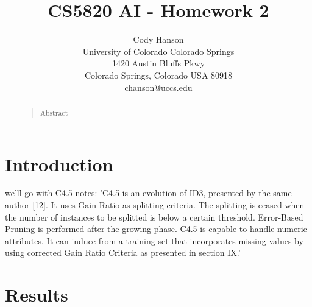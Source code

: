 \documentclass[letterpaper]{article}
\begin{document}
\title{CS5820 AI - Homework 2}
\author{Cody Hanson\\
University of Colorado Colorado Springs\\
1420 Austin Bluffs Pkwy\\
Colorado Springs, Colorado USA 80918\\
chanson@uccs.edu}
\maketitle
\begin{abstract}
\begin{quote}
Abstract
\end{quote}
\end{abstract}

\section{Introduction}


we'll go with C4.5
notes:
'C4.5 is an evolution of ID3, presented by the same author [12]. It uses Gain Ratio as splitting criteria. The splitting is ceased when the number of instances to be splitted is below a certain threshold. Error-Based Pruning is performed after the growing phase. C4.5 is capable to handle numeric attributes. It can induce from a training set that incorporates missing values by using corrected Gain Ratio Criteria as presented in section IX.'



\section{Results}



\onecolumn
\newpage
\end{document}
